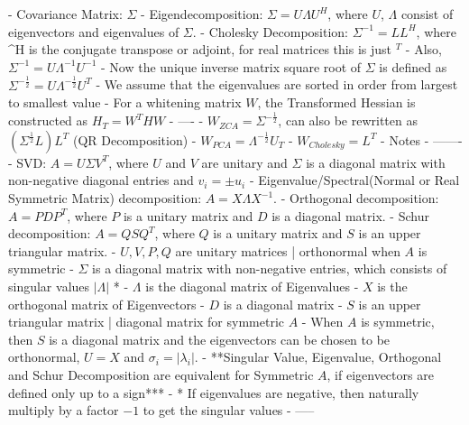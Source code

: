 - Covariance Matrix: $\Sigma$
- Eigendecomposition: $\Sigma = U\Lambda U^{H}$, where $U$,  $\Lambda$ consist of eigenvectors and eigenvalues of $\Sigma$.
- Cholesky Decomposition: $\Sigma^{-1} = LL^{H}$, where ^{H} is the conjugate transpose or adjoint, for real matrices this is just $^{T}$
- Also, $\Sigma^{-1} = U \Lambda^{-1} U^{-1}$
- Now the unique inverse matrix square root of $\Sigma$ is defined as  $\Sigma^{−\frac{1}{2}} = U\Lambda^{-\frac{1}{2}}U^{T}$
- We assume that the eigenvalues are sorted in order from largest to smallest value
- For a whitening matrix $W$, the Transformed Hessian is constructed as $H_{T} = W^{T}HW$
- ----
- $W_{ZCA} = \Sigma^{−\frac{1}{2}}$, can also be rewritten as $(\Sigma^{\frac{1}{2}} L) L^{T}$ (QR Decomposition)
- $W_{PCA} = \Lambda^{-\frac{1}{2}}U_{T}$
- $W_{Cholesky} = L^{T}$
- Notes
- -------
- SVD: $A=U \Sigma V^T$, where $U$ and $V$ are unitary and $\Sigma$ is a diagonal matrix with non-negative diagonal entries and $v_i= \pm u_i$
- Eigenvalue/Spectral(Normal or Real Symmetric Matrix) decomposition: $A=X \Lambda X^{-1}$.
- Orthogonal decomposition: $A=P D P^T$, where $P$ is a unitary matrix and $D$ is a diagonal matrix.
- Schur decomposition: $A=Q S Q^T$, where $Q$ is a unitary matrix and $S$ is an upper triangular matrix.
- $U, V, P, Q$ are unitary matrices | orthonormal when $A$ is symmetric
- $\Sigma$ is a diagonal matrix with non-negative entries, which consists of singular values $|\Lambda|$ *
- $\Lambda$ is the diagonal matrix of Eigenvalues
- $X$ is the orthogonal matrix of Eigenvectors
- $D$ is a diagonal matrix
- $S$ is an upper triangular matrix | diagonal matrix for symmetric $A$
- When $A$ is symmetric, then $S$ is a diagonal matrix and the eigenvectors can be chosen to be orthonormal, $U=X$ and $\sigma_i=\left|\lambda_i\right|$.
- **Singular Value, Eigenvalue, Orthogonal and Schur Decomposition are equivalent for Symmetric $A$, if eigenvectors are defined only up to a sign***
- * If eigenvalues are negative, then naturally multiply by a factor  $-1$ to get the singular values
- -----